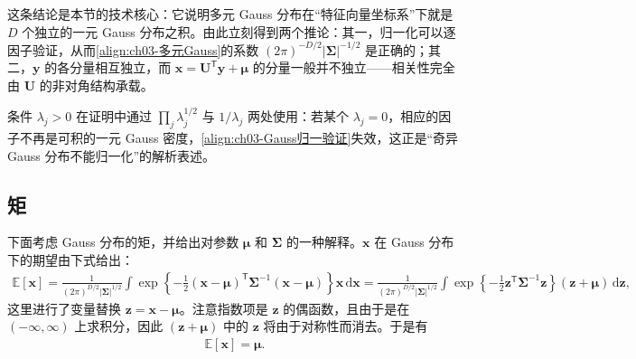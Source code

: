 \documentclass[../../main.tex]{subfiles}
\begin{document}
\begin{remark}
这条结论是本节的技术核心：它说明多元 Gauss 分布在“特征向量坐标系”下就是 $D$ 个独立的一元 Gauss 分布之积。由此立刻得到两个推论：其一，归一化可以逐因子验证，从而\eqref{align:ch03-多元Gauss}的系数 $(2\pi)^{-D/2}\lvert\boldsymbol{\Sigma}\rvert^{-1/2}$ 是正确的；其二，$\boldsymbol{y}$ 的各分量相互独立，而 $\boldsymbol{x}=\boldsymbol{U}^{\mathsf{T}}\boldsymbol{y}+\boldsymbol{\mu}$ 的分量一般并不独立——相关性完全由 $\boldsymbol{U}$ 的非对角结构承载。

条件 $\lambda_j>0$ 在证明中通过 $\prod_j\lambda_j^{1/2}$ 与 $1/\lambda_j$ 两处使用：若某个 $\lambda_j=0$，相应的因子不再是可积的一元 Gauss 密度，\eqref{align:ch03-Gauss归一验证}失效，这正是“奇异 Gauss 分布不能归一化”的解析表述。
\end{remark}

\subsection{矩}\label{subsection:ch03-矩}

下面考虑 Gauss 分布的矩，并给出对参数 $\boldsymbol{\mu}$ 和 $\boldsymbol{\Sigma}$ 的一种解释。$\boldsymbol{x}$ 在 Gauss 分布下的期望由下式给出：
\begin{align}
\mathbb{E}[\boldsymbol{x}]=\frac{1}{(2\pi)^{D/2}\lvert\boldsymbol{\Sigma}\rvert^{1/2}}\int\exp\left\{-\frac{1}{2}(\boldsymbol{x}-\boldsymbol{\mu})^{\mathsf{T}}\boldsymbol{\Sigma}^{-1}(\boldsymbol{x}-\boldsymbol{\mu})\right\}\boldsymbol{x}\,\mathrm{d}\boldsymbol{x}
=\frac{1}{(2\pi)^{D/2}\lvert\boldsymbol{\Sigma}\rvert^{1/2}}\int\exp\left\{-\frac{1}{2}\boldsymbol{z}^{\mathsf{T}}\boldsymbol{\Sigma}^{-1}\boldsymbol{z}\right\}(\boldsymbol{z}+\boldsymbol{\mu})\,\mathrm{d}\boldsymbol{z},
\label{align:ch03-Gauss均值期望}
\end{align}
这里进行了变量替换 $\boldsymbol{z}=\boldsymbol{x}-\boldsymbol{\mu}$。注意指数项是 $\boldsymbol{z}$ 的偶函数，且由于是在 $(-\infty,\infty)$ 上求积分，因此 $(\boldsymbol{z}+\boldsymbol{\mu})$ 中的 $\boldsymbol{z}$ 将由于对称性而消去。于是有
\begin{align}
\mathbb{E}[\boldsymbol{x}]=\boldsymbol{\mu}.
\label{align:ch03-Gauss均值}
\end{align}
\end{document}
